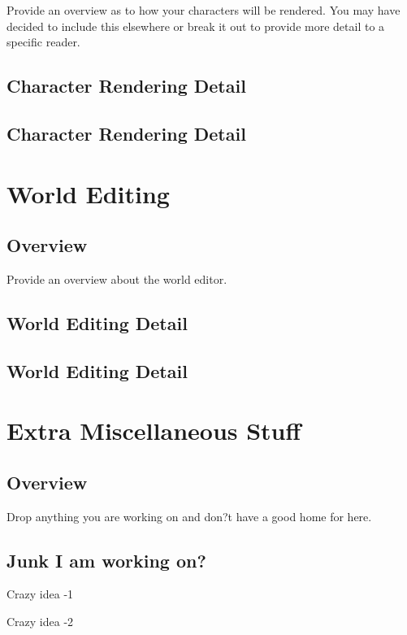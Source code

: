 \documentclass[a4paper]{report}
\begin{document}
		Provide an overview as to how your characters will be rendered.  You may have decided to include this elsewhere or break it out to provide more detail to a specific reader.

	\section{Character Rendering Detail}

	\section{Character Rendering Detail}

\chapter{World Editing}

	\section{Overview}

		Provide an overview about the world editor.

	\section{World Editing Detail}

	\section{World Editing Detail}

\chapter{Extra Miscellaneous Stuff}

	\section{Overview}

		Drop anything you are working on and don?t have a good home for here.

	\section{Junk I am working on?}

		Crazy idea -1

		Crazy idea -2
\end{document}
